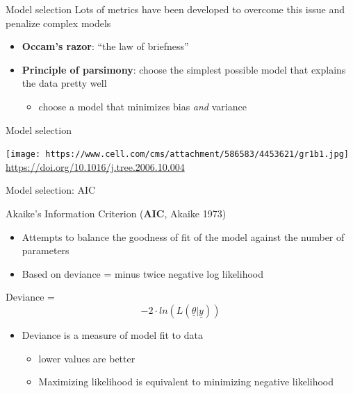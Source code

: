 \documentclass[ignorenonframetext,]{beamer}
\providecommand{\tightlist}{%
  \setlength{\itemsep}{0pt}\setlength{\parskip}{0pt}}
\begin{document}
\begin{frame}[fragile]
\begin{block}{Model selection}
Lots of metrics have been developed to overcome this issue and penalize
complex models

\begin{itemize}
\item
  \textbf{Occam's razor}: ``the law of briefness''
\item
  \textbf{Principle of parsimony}: choose the simplest possible model
  that explains the data pretty well

  \begin{itemize}
  \tightlist
  \item
    choose a model that minimizes bias \emph{and} variance
  \end{itemize}
\end{itemize}

\end{block}

\begin{block}{Model selection}

\texttt{[image: https://www.cell.com/cms/attachment/586583/4453621/gr1b1.jpg]}
\url{https://doi.org/10.1016/j.tree.2006.10.004}

\end{block}

\begin{block}{Model selection: AIC}

Akaike's Information Criterion (\textbf{AIC}, Akaike 1973)

\begin{itemize}
\item
  Attempts to balance the goodness of fit of the model against the
  number of parameters
\item
  Based on deviance = minus twice negative log likelihood
\end{itemize}

Deviance =
\[-2\cdot ln\left( L(\underline { \theta } |\underline { y  } ) \right)\]

\begin{itemize}
\tightlist
\item
  Deviance is a measure of model fit to data

  \begin{itemize}
  \tightlist
  \item
    lower values are better
  \item
    Maximizing likelihood is equivalent to minimizing negative
    likelihood
  \end{itemize}
\end{itemize}


\end{block}
\end{frame}
\end{document}
